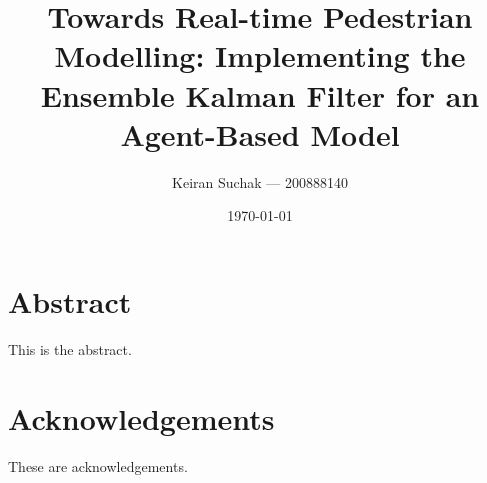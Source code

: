 \documentclass[11pt, twoside, a4paper]{report}
\begin{document}
\title{Towards Real-time Pedestrian Modelling: Implementing the Ensemble Kalman
Filter for an Agent-Based Model}
\author{Keiran Suchak --- 200888140}
\date{\today}


\chapter*{\centering Abstract}

This is the abstract.

\chapter*{\centering Acknowledgements}

These are acknowledgements.

\tableofcontents
\listoffigures
\listoftables


\end{document}
